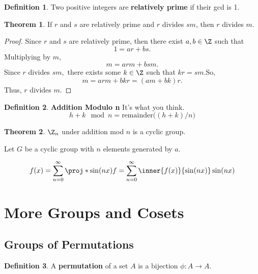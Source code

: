 \documentclass[a5paper]{article}
\theoremstyle{definition}%
\newtheorem*{theorem*}{Theorem} %
\newtheorem*{definition*}{Definition}
\numberwithin{exercise}{section}
\theoremstyle{remark}%
\begin{document}
\begin{definition*}
Two positive integers are \textbf{relatively prime} if their gcd is 1.
\end{definition*}

\begin{highlight}
\begin{theorem*}
If $r$ and $s$ are relatively prime and $r$ divides $sm$, then $r$ divides $m$.
\end{theorem*}
\end{highlight}
\begin{proof}
Since $r$ and $s$ are relatively prime, then there exist $a,b\in\Z$ such that 
$$1=ar+bs.$$
Multiplying by $m$, 
$$m=arm+bsm.$$
Since $r$ divides $sm,$ there exists some $k\in\Z$ such that $kr=sm$.So, 
$$m=arm+bkr=(am+bk)r.$$
Thus, $r$ divides $m$.
\end{proof}

\begin{definition*}
\textbf{Addition Modulo n} It's what you think. 
$$h+k\mod n = \text{remainder}\big((h+k)/n\big)$$
\end{definition*}

\begin{theorem*}
$\Z_n$ under addition mod $n$ is a cyclic group. 
\end{theorem*}

\begin{highlight}
Let $G$ be a cyclic group with $n$ elements generated by $a$.  
\end{highlight}

$$f(x)=\sum_{n=0}^\infty 
\proj*{\sin(nx)}{f}=\sum_{n=0}^\infty \inner{f(x)}{\sin(nx)}\sin(nx)$$

\section{More Groups and Cosets}

\subsection{Groups of Permutations}

\begin{highlight}
\begin{definition*}
A \textbf{permutation} of a set $A$ is a bijection $\phi:A\to A$. 
\end{definition*}
\end{highlight}
\end{document}
